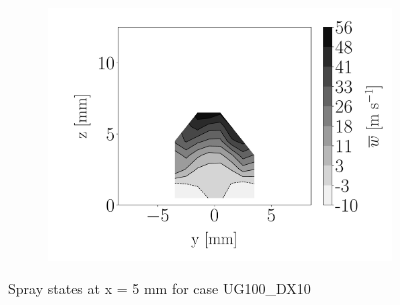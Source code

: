 \begin{figure}[h!]
\begin{subfigure}[b]{0.3\textwidth}
	\centering
   \includegraphics[scale=\scaleSLIJICF]{./part2_developments/figures_ch5_resolved_JICF/injectors_SLI/uG100_dx10_x05_uz_mean_map}
\end{subfigure}
\caption{Spray states at x = 5 mm for case UG100\_DX10}
\label{fig:injectors_sli_uG100_dx10_x05}
\end{figure}




